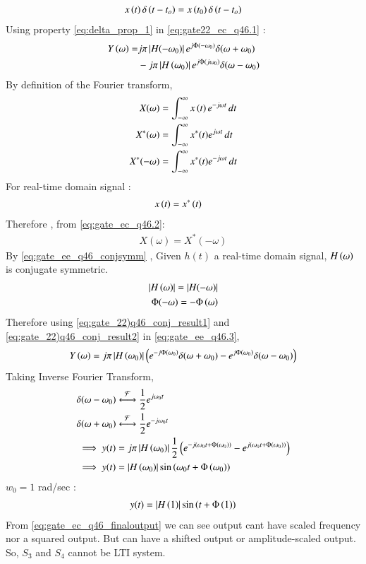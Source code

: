 \documentclass[journal,12pt,twocolumn]{IEEEtran}
\theoremstyle{remark}
\begin{document}
\begin{align}
    x\left(t\right)\delta\left(t-t_{o}\right) = x\left(t_{0}\right)\delta\left(t-t_{o}\right) \label{eq:delta_prop_1}
\end{align}
Using property \eqref{eq:delta_prop_1} in \eqref{eq:gate22_ec_q46.1} :
\begin{align}
    Y\left(\omega\right)=&j\pi \left\vert H(-\omega_0)\right\vert e^{j\Phi(-\omega_0)}\delta(\omega+\omega_0)\label{eq:gate_ee_q46.3} \\&- j\pi \left\vert H\left(\omega_0\right)\right\vert e^{j\Phi(j\omega_0)}\delta(\omega-\omega_0) \notag 
\end{align}
By definition of the Fourier transform,
\begin{align}
    X(\omega) &= \int_{-\infty}^{\infty} x\left(t\right)e^{-j\omega t} \,dt \\
    X^*(\omega) &= \int_{-\infty}^{\infty} x^*(t)e^{j\omega t} \,dt \\
    X^*(-\omega) &= \int_{-\infty}^{\infty} x^*(t)e^{-j\omega t} \,dt\label{eq:gate_ec_q46.2}
\end{align}
For real-time domain signal :
\begin{align}
    x\left(t\right) &= x^*\left(t\right)
\end{align}
Therefore , from \eqref{eq:gate_ec_q46.2}:
\begin{align}
    X(\omega) =  X^*(-\omega) \label{eq:gate_ee_q46_conjsymm}
\end{align}
By \eqref{eq:gate_ee_q46_conjsymm} , Given $h(t)$ a real-time domain signal, $H\left(\omega\right)$ is conjugate symmetric.
\begin{align}
    \left\vert H\left(\omega\right)\right\vert=\left\vert H(-\omega)\right\vert\label{eq:gate_22)q46_conj_result1}\\
    \Phi(-\omega)=-\Phi\left(\omega\right)\label{eq:gate_22)q46_conj_result2}
\end{align}
Therefore using \eqref{eq:gate_22)q46_conj_result1} and \eqref{eq:gate_22)q46_conj_result2} in \eqref{eq:gate_ee_q46.3},
 \begin{align}
    Y\left(\omega\right)= j\pi \left\vert H\left(\omega_0\right)\right\vert\left(e^{-j\Phi\left(\omega_0\right)}\delta(\omega+\omega_0) - e^{j\Phi\left(\omega_0\right)}\delta(\omega-\omega_0)\right)
\end{align}
Taking Inverse Fourier Transform, 
\begin{align}
    &\delta(\omega-\omega_0) \system{F} \frac{1}{2}e^{j\omega_0t}\\
     &\delta(\omega+\omega_0) \system{F} \frac{1}{2}e^{-j\omega_0t}\\
    &\implies y(t)=j\pi \abs{H\brak{\omega_0}}\frac{1}{2}\brak{e^{-j\brak{\omega_0t+\Phi\brak{\omega_0}}}-e^{j\brak{\omega_0t+\Phi\brak{\omega_0}}}}\\
    &\implies y(t) =\abs{H\brak{\omega_0}}\sin{\brak{\omega_0t+\Phi\brak{\omega_0}}} 
\end{align}
$w_{0} = 1$ rad/sec :
\begin{align}
    y(t) =\left\vert H\left(1\right)\right\vert\sin{\ensuremath{\left(t+\Phi\left(1\right)\right)}} \label{eq:gate_ec_q46_finaloutput}
\end{align}
From \eqref{eq:gate_ec_q46_finaloutput} we can see output cant have scaled frequency nor a squared output. But can have a shifted output or amplitude-scaled output. \\

So, $S_{3}$ and $S_{4}$ cannot be LTI system.
\end{document}
